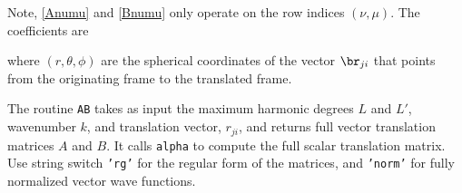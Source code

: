 Note, \eqref{Anumu} and \eqref{Bnumu} only operate on the row indices $(\nu,\mu)$. The coefficients are 

\noindent where $(r,\theta,\phi)$ are the spherical coordinates of the vector $\br_{ji}$ that points from the originating frame to the translated frame.


The routine \texttt{AB} takes as input the maximum harmonic degrees $L$ and $L'$, wavenumber $k$, and translation vector, $r_{ji}$, and returns full vector translation matrices $A$ and $B$. It calls \texttt{alpha} to compute the full scalar translation matrix. Use string switch \texttt{'rg'} for the regular form of the matrices, and \texttt{'norm'} for fully normalized vector wave functions. 



{\footnotesize
{}
}




